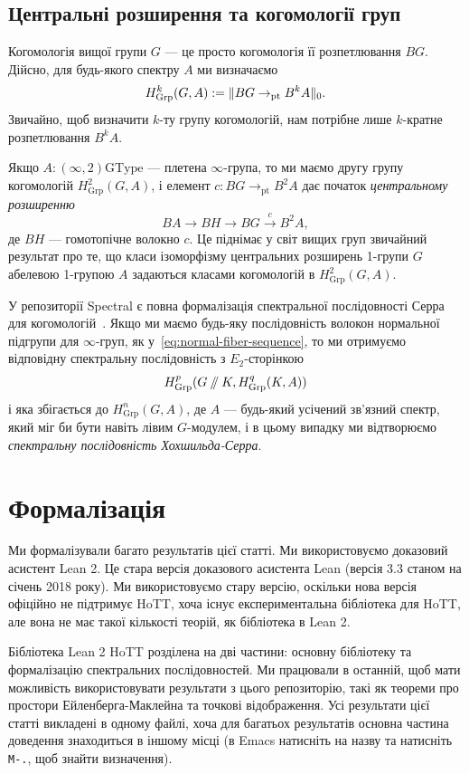 \documentclass[12pt]{article}
\newcommand*{\pt}{{\mathrm{pt}}}
\newcommand*{\dblslash}{\mathbin{/\kern-3pt/}}
\DeclarePairedDelimiter\trunc{\lVert}{\rVert}
\newcommand*{\GType}{\mathrm{GType}}
\begin{document}
\subsection{Центральні розширення та когомології груп}
\label{sec:group-cohomology}

Когомологія вищої групи $G$ — це просто когомологія її розпетлювання $BG$. Дійсно, для будь-якого спектру $A$ ми визначаємо
\[
  H_{\mathrm{Grp}}^k(G, A) := \trunc{BG \to_\pt B^kA}_0.
\]
Звичайно, щоб визначити $k$-ту групу когомологій, нам потрібне лише $k$-кратне розпетлювання $B^kA$.

Якщо $A : (\infty,2)\GType$ — плетена $\infty$-група, то ми маємо другу групу когомологій $H_{\mathrm{Grp}}^2(G, A)$, і елемент $c : BG \to_\pt B^2A$ дає початок \emph{центральному розширенню}
\[
  BA \to BH \to BG \xrightarrow{c}{} B^2A,
\]
де $BH$ — гомотопічне волокно $c$. Це піднімає у світ вищих груп звичайний результат про те, що класи ізоморфізму центральних розширень 1-групи $G$ абелевою 1-групою $A$ задаються класами когомологій в $H_{\mathrm{Grp}}^2(G, A)$.

\smallskip

У репозиторії Spectral є повна формалізація спектральної послідовності Серра для когомологій~\cite{SerreSpectralSequence}. Якщо ми маємо будь-яку послідовність волокон нормальної підгрупи для $\infty$-груп, як у~\eqref{eq:normal-fiber-sequence}, то ми отримуємо відповідну спектральну послідовність з $E_2$-сторінкою
\[
  H_{\mathrm{Grp}}^p(G \dblslash K, H_{\mathrm{Grp}}^q(K, A))
\]
і яка збігається до $H_{\mathrm{Grp}}^n(G, A)$, де $A$ — будь-який усічений зв'язний спектр, який міг би бути навіть лівим $G$-модулем, і в цьому випадку ми відтворюємо \emph{спектральну послідовність Хохшильда-Серра}.

\section{Формалізація}
\label{sec:formalization}
Ми формалізували багато результатів цієї статті. Ми використовуємо доказовий асистент Lean 2. Це стара версія доказового асистента Lean (версія 3.3 станом на січень 2018 року). Ми використовуємо стару версію, оскільки нова версія офіційно не підтримує HoTT, хоча існує експериментальна бібліотека для HoTT, але вона не має такої кількості теорій, як бібліотека в Lean 2.

Бібліотека Lean 2 HoTT розділена на дві частини: основну бібліотеку та формалізацію спектральних послідовностей. Ми працювали в останній, щоб мати можливість використовувати результати з цього репозиторію, такі як теореми про простори Ейленберга-Маклейна та точкові відображення. Усі результати цієї статті викладені в одному файлі, хоча для багатьох результатів основна частина доведення знаходиться в іншому місці (в Emacs натисніть на назву та натисніть \texttt{M-.}, щоб знайти визначення).
\end{document}
